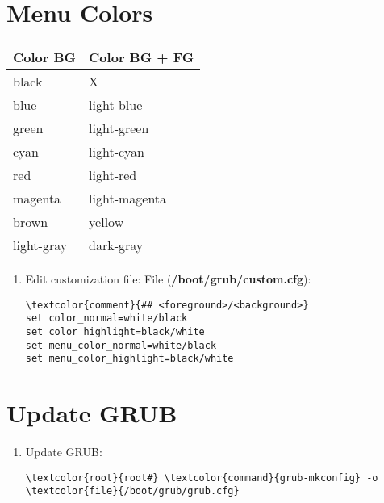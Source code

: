 \documentclass[10pt, a4paper, onecolumn, openany]{book} %
\begin{document}
\section{Menu Colors}
\begin{center}
    \begin{small}
    \begin{tabular}{|p{4cm}|p{4cm}|}
    \hline
    \textbf{Color BG} & \textbf{Color BG + FG} \\
    \hline
    black & X \\
    \hline
    blue & light-blue \\
    \hline
    green & light-green \\
    \hline
    cyan & light-cyan \\
    \hline
    red & light-red \\
    \hline
    magenta & light-magenta \\
    \hline
    brown & yellow \\
    \hline
    light-gray & dark-gray  \\
    \hline
    \end{tabular}
    \end{small}
\end{center}
\begin{enumerate}
    \item Edit customization file:
\newline File (\textbf{\textcolor{file}{/boot/grub/custom.cfg}}):
\begin{Verbatim}[commandchars=\\\{\}]
\textcolor{comment}{## <foreground>/<background>}
set color_normal=white/black
set color_highlight=black/white
set menu_color_normal=white/black
set menu_color_highlight=black/white
\end{Verbatim}
\end{enumerate}
\section{Update GRUB}
\label{GRUB}
\begin{enumerate}
    \item Update GRUB:
\begin{Verbatim}[commandchars=\\\{\}]
\textcolor{root}{root#} \textcolor{command}{grub-mkconfig} -o \textcolor{file}{/boot/grub/grub.cfg}
\end{Verbatim}
\end{enumerate}
\end{document}
